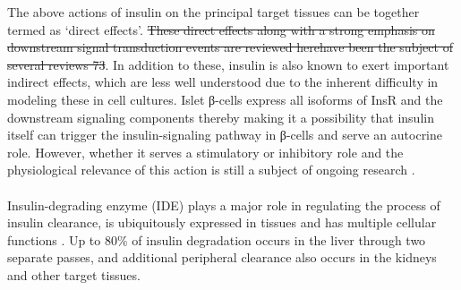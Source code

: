 The above actions of insulin on the principal target tissues can be together termed as `direct effects’. \st{These direct effects along with a strong emphasis on downstream signal transduction events are reviewed herehave been the subject of several reviews 73}. In addition to these, insulin is also known to exert important indirect effects, which are less well understood due to the inherent difficulty in modeling these in cell cultures. Islet β-cells express all isoforms of InsR and the downstream signaling components thereby making it a possibility that insulin itself can trigger the insulin-signaling pathway in β-cells and serve an autocrine role. However, whether it serves a stimulatory or inhibitory role and the physiological relevance of this action is still a subject of ongoing research \textbf{\cite{rhodes_direct_2013,rachdaoui_insulin_2020}}.\\\\
Insulin-degrading enzyme (IDE) plays a major role in regulating the process of insulin clearance, is ubiquitously expressed in tissues and has multiple cellular functions \textbf{\cite{duckworth_insulin_1998}}. Up to 80\% of insulin degradation occurs in the liver through two separate passes, and additional peripheral clearance also occurs in the kidneys and other target tissues.


